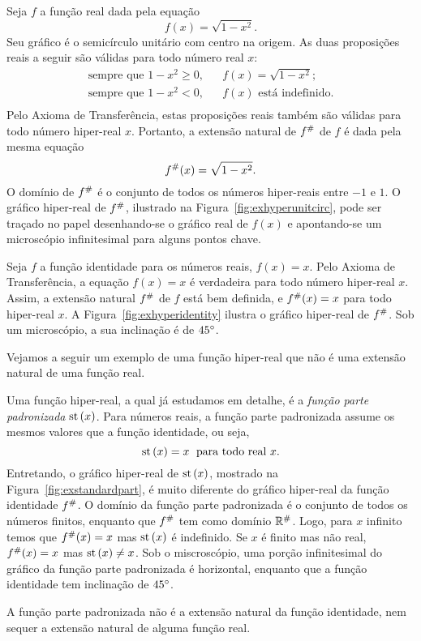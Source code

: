 \begin{example}
Seja $f$ a função real dada pela equação
$$
  f(x) = \sqrt{1-x^2}.
$$
Seu gráfico é o semicírculo unitário com centro na origem. As duas proposições
reais a seguir são válidas para todo número real $x$:
\begin{eqnarray*}
  \text{sempre que } 1-x^2 \ge 0, & & f(x) = \sqrt{1-x^2}; \\
  \text{sempre que } 1-x^2 < 0,   & & f(x) \text{ está indefinido.} \\
\end{eqnarray*}
Pelo Axioma de Transferência, estas proposições reais também são válidas
para todo número hiper-real $x$. Portanto, a extensão natural de ${f}^\#$
de $f$ é dada pela mesma equação
$$
  {f}^\#(x) = \sqrt{1-x^2}.
$$
O domínio de ${f}^\#$ é o conjunto de todos os números hiper-reais entre
$-1$ e $1$. O gráfico hiper-real de ${f}^\#$, ilustrado na
Figura~\ref{fig:exhyperunitcirc}, pode ser traçado no papel desenhando-se
o gráfico real de $f(x)$ e apontando-se um microscópio infinitesimal para
alguns pontos chave.
\end{example}


\begin{example}
Seja $f$ a função identidade para os números reais, $f(x) = x$. Pelo
Axioma de Transferência, a equação $f(x) = x$ é verdadeira para todo
número hiper-real $x$. Assim, a extensão natural ${f}^\#$ de $f$
está bem definida, e ${f}^\#(x) = x$ para todo hiper-real $x$. A
Figura~\ref{fig:exhyperidentity} ilustra o gráfico hiper-real de
${f}^\#$. Sob um microscópio, a sua inclinação é de $45\degree$.
\end{example}


Vejamos a seguir um exemplo de uma função hiper-real que não é uma
extensão natural de uma função real.

\begin{example}
Uma função hiper-real, a qual já estudamos em detalhe, é a \emph{função
parte padronizada} $\operatorname{st}\left(x\right)$. Para números reais, a função parte padronizada
assume os mesmos valores que a função identidade, ou seja,
$$
  \operatorname{st}\left(x\right) = x \; \text{ para todo real } x.
$$
Entretando, o gráfico hiper-real de $\operatorname{st}\left(x\right)$, mostrado na
Figura~\ref{fig:exstandardpart}, é muito diferente do gráfico hiper-real
da função identidade ${f}^\#$. O domínio da função parte padronizada
é o conjunto de todos os números finitos, enquanto que ${f}^\#$ tem
como domínio ${\mathbb{R}}^\#$. Logo, para $x$ infinito temos que ${f}^\#(x) = x$
mas $\operatorname{st}\left(x\right)$ é indefinido. Se $x$ é finito mas não real, ${f}^\#(x) = x$
mas $\operatorname{st}\left(x\right) \ne x$. Sob o miscroscópio, uma porção infinitesimal do gráfico
da função parte padronizada é horizontal, enquanto que a função identidade
tem inclinação de $45\degree$.

A função parte padronizada não é a extensão natural da função identidade,
nem sequer a extensão natural de alguma função real.
\end{example}

